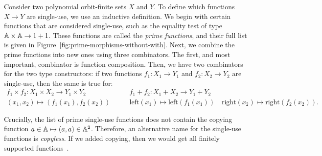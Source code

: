Consider two polynomial orbit-finite sets $X$ and $Y$. To define which functions $X \to Y$ are single-use, we use an inductive definition. We begin with certain functions that are considered single-use, such as the equality test of type $\mathbb A \times \mathbb A \to 1 + 1$. These functions are called the \emph{prime functions}, and their full list is given in Figure~\ref{fig:prime-morphisms-without-with}. Next, we combine the prime functions into new ones using three combinators. The first, and most important, combinator is  function composition. Then, we have two combinators for the two type constructors: if two functions $f_1 : X_1 \to Y_1$ and $f_2 : X_2 \to Y_2$ are single-use, then the same is true for:
\begin{align*}
    f_1 \times f_2 : X_1 \times X_2 \to Y_1 \times Y_2
    \qquad &
    f_1 + f_2 : X_1 + X_2 \to Y_1 + Y_2 \\
    \scriptstyle  (x_1,x_2) \mapsto (f_1(x_1),f_2(x_2)) 
    \qquad &
    {\scriptstyle \text{left}(x_1) \mapsto \text{left}(f_1(x_1)) 
        \quad 
        \text{right}(x_2) \mapsto \text{right}(f_2(x_2)) }.
\end{align*}

Crucially, the list of prime single-use functions does not contain the copying function $a \in \mathbb A \mapsto (a,a) \in \mathbb A^2$. Therefore, an alternative name for the single-use functions is \emph{copyless}. If we added copying, then we would get all finitely supported functions~\cite[Lemma 23]{stefanski-phd}.

